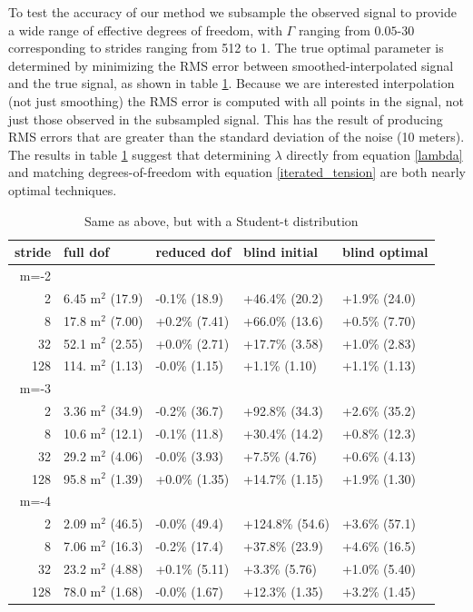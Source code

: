 \documentclass[10pt,journal]{IEEEtran}
\begin{document}
To test the accuracy of our method we subsample the observed signal to provide a wide range of effective degrees of freedom, with $\Gamma$ ranging from $0.05$-$30$ corresponding to strides ranging from 512 to 1. The true optimal parameter is determined by minimizing the RMS error between smoothed-interpolated signal and the true signal, as shown in table \ref{fit_results}. Because we are interested interpolation (not just smoothing) the RMS error is computed with all points in the signal, not just those observed in the subsampled signal. This has the result of producing RMS errors that are greater than the standard deviation of the noise (10 meters). The results in table \ref{fit_results} suggest that determining $\lambda$ directly from equation \ref{lambda} and matching degrees-of-freedom with equation \ref{iterated_tension} are both nearly optimal techniques.

\begin{table}[ht]
\caption{Same as above, but with a Student-t distribution }
\label{fit_results}
\centering
\begin{tabular}{r | llll} stride & full dof & reduced dof & blind initial & blind optimal \\ \hline \hline 
m=-2 &&&&  \\ \hline 
2 & 6.45 m$^2$ (17.9) &  -0.1\% (18.9) &  +46.4\% (20.2) &  +1.9\% (24.0) \\ 
8 & 17.8 m$^2$ (7.00) &  +0.2\% (7.41) &  +66.0\% (13.6) &  +0.5\% (7.70) \\ 
32 & 52.1 m$^2$ (2.55) &  +0.0\% (2.71) &  +17.7\% (3.58) &  +1.0\% (2.83) \\ 
128 & 114. m$^2$ (1.13) &  -0.0\% (1.15) &  +1.1\% (1.10) &  +1.1\% (1.13) \\ 
m=-3 &&&&  \\ \hline 
2 & 3.36 m$^2$ (34.9) &  -0.2\% (36.7) &  +92.8\% (34.3) &  +2.6\% (35.2) \\ 
8 & 10.6 m$^2$ (12.1) &  -0.1\% (11.8) &  +30.4\% (14.2) &  +0.8\% (12.3) \\ 
32 & 29.2 m$^2$ (4.06) &  -0.0\% (3.93) &  +7.5\% (4.76) &  +0.6\% (4.13) \\ 
128 & 95.8 m$^2$ (1.39) &  +0.0\% (1.35) &  +14.7\% (1.15) &  +1.9\% (1.30) \\ 
m=-4 &&&&  \\ \hline 
2 & 2.09 m$^2$ (46.5) &  -0.0\% (49.4) &  +124.8\% (54.6) &  +3.6\% (57.1) \\ 
8 & 7.06 m$^2$ (16.3) &  -0.2\% (17.4) &  +37.8\% (23.9) &  +4.6\% (16.5) \\ 
32 & 23.2 m$^2$ (4.88) &  +0.1\% (5.11) &  +3.3\% (5.76) &  +1.0\% (5.40) \\ 
128 & 78.0 m$^2$ (1.68) &  -0.0\% (1.67) &  +12.3\% (1.35) &  +3.2\% (1.45) \\ 
\end{tabular} 

\end{table}
\end{document}
